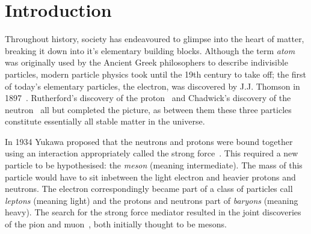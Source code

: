 \chapter{Introduction} 
\label{ch:introduction}

\minitoc 





Throughout history, society has endeavoured to glimpse into the heart of matter, breaking it down into it's elementary building blocks.
Although the term \emph{atom} was originally used by the Ancient Greek philosophers to describe indivisible particles, modern particle physics took until the 19th century to take off; the first of today's elementary particles, the electron, was discovered by J.J. Thomson in 1897~\cite{electron}.
Rutherford's discovery of the proton~\cite{Rutherford:1911zz} and Chadwick's discovery of the neutron~\cite{Chadwick:1932ma} all but completed the picture, as between them these three particles constitute essentially all stable matter in the universe.  

In 1934 Yukawa proposed that the neutrons and protons were bound together using an interaction appropriately called the strong force~\cite{193548}. This required a new particle to be hypothesised: the \emph{meson} (meaning intermediate). The mass of this particle would have to sit inbetween the light electron and heavier  protons and neutrons. The electron correspondingly became part of a class of particles call \emph{leptons} (meaning light) and the protons and neutrons part of \emph{baryons} (meaning heavy). 
The search for the strong force mediator resulted in the joint discoveries of the pion and muon~\cite{Lattes:1947mw,Lattes:1947mx}, both initially thought to be mesons. 


